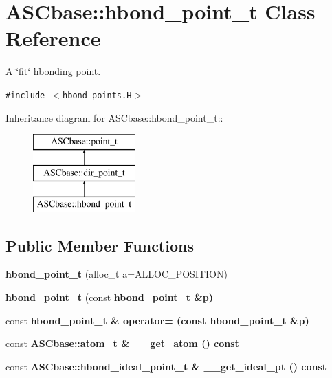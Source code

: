 \section{ASCbase::hbond\_\-point\_\-t Class Reference}
\label{classASCbase_1_1hbond__point__t}
A \char`\"{}fit\char`\"{} hbonding point.  


{\tt \#include $<$hbond\_\-points.H$>$}

Inheritance diagram for ASCbase::hbond\_\-point\_\-t::\begin{figure}[H]
\begin{center}
\leavevmode
\includegraphics[height=3cm]{classASCbase_1_1hbond__point__t}
\end{center}
\end{figure}
\subsection*{Public Member Functions}
\begin{CompactItemize}
\item 
\textbf{hbond\_\-point\_\-t} (alloc\_\-t a=ALLOC\_\-POSITION)\label{classASCbase_1_1hbond__point__t_5fab75a5579f51c63612ddb147c3eb0a}

\item 
\textbf{hbond\_\-point\_\-t} (const \bf{hbond\_\-point\_\-t} \&p)\label{classASCbase_1_1hbond__point__t_a0e83b45350073eb28ceefc0c995861c}

\item 
const \bf{hbond\_\-point\_\-t} \& \textbf{operator=} (const \bf{hbond\_\-point\_\-t} \&p)\label{classASCbase_1_1hbond__point__t_c77fa3dc05e58c6cede53e560f663291}

\item 
const \bf{ASCbase::atom\_\-t} \& \textbf{\_\-\_\-get\_\-atom} () const \label{classASCbase_1_1hbond__point__t_faf40b7877ec78b4a2e134369fb5e8cf}

\item 
const \bf{ASCbase::hbond\_\-ideal\_\-point\_\-t} \& \textbf{\_\-\_\-get\_\-ideal\_\-pt} () const \label{classASCbase_1_1hbond__point__t_ed40f565437b493c187f56297417d2ec}

\end{CompactItemize}
